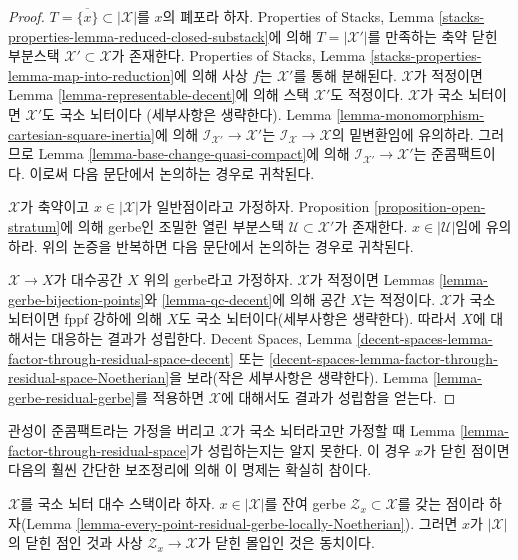 \begin{proof}
$T = \overline{\{x\}} \subset |\mathcal{X}|$를 $x$의 폐포라 하자.
Properties of Stacks, Lemma
\ref{stacks-properties-lemma-reduced-closed-substack}에 의해
$T = |\mathcal{X}'|$를 만족하는 축약 닫힌 부분스택
$\mathcal{X}' \subset \mathcal{X}$가 존재한다. Properties of Stacks,
Lemma \ref{stacks-properties-lemma-map-into-reduction}에 의해 사상 $f$는
$\mathcal{X}'$를 통해 분해된다. $\mathcal{X}$가 적정이면 Lemma
\ref{lemma-representable-decent}에 의해 스택 $\mathcal{X}'$도 적정이다.
$\mathcal{X}$가 국소 뇌터이면 $\mathcal{X}'$도 국소 뇌터이다
(세부사항은 생략한다).
Lemma \ref{lemma-monomorphism-cartesian-square-inertia}에 의해
$\mathcal{I}_{\mathcal{X}'} \to \mathcal{X}'$는
$\mathcal{I}_\mathcal{X} \to \mathcal{X}$의 밑변환임에 유의하라.
그러므로 Lemma \ref{lemma-base-change-quasi-compact}에 의해
$\mathcal{I}_{\mathcal{X}'} \to \mathcal{X}'$는 준콤팩트이다.
이로써 다음 문단에서 논의하는 경우로 귀착된다.

\medskip\noindent
$\mathcal{X}$가 축약이고 $x \in |\mathcal{X}|$가 일반점이라고 가정하자.
Proposition \ref{proposition-open-stratum}에 의해 gerbe인 조밀한 열린
부분스택 $\mathcal{U} \subset \mathcal{X}'$가 존재한다.
$x \in |\mathcal{U}|$임에 유의하라. 위의 논증을 반복하면 다음 문단에서
논의하는 경우로 귀착된다.

\medskip\noindent
$\mathcal{X} \to X$가 대수공간 $X$ 위의 gerbe라고 가정하자.
$\mathcal{X}$가 적정이면 Lemmas \ref{lemma-gerbe-bijection-points}와
\ref{lemma-qc-decent}에 의해 공간 $X$는 적정이다. $\mathcal{X}$가 국소
뇌터이면 fppf 강하에 의해 $X$도 국소 뇌터이다(세부사항은 생략한다).
따라서 $X$에 대해서는 대응하는 결과가 성립한다. Decent Spaces, Lemma
\ref{decent-spaces-lemma-factor-through-residual-space-decent} 또는
\ref{decent-spaces-lemma-factor-through-residual-space-Noetherian}을
보라(작은 세부사항은 생략한다). Lemma
\ref{lemma-gerbe-residual-gerbe}를 적용하면 $\mathcal{X}$에 대해서도
결과가 성립함을 얻는다.
\end{proof}

\begin{remark}
\label{lemma-factor-through-residual-space-Noetherian}
관성이 준콤팩트라는 가정을 버리고 $\mathcal{X}$가 국소 뇌터라고만
가정할 때 Lemma \ref{lemma-factor-through-residual-space}가 성립하는지는
알지 못한다. 이 경우 $x$가 닫힌 점이면 다음의 훨씬 간단한 보조정리에
의해 이 명제는 확실히 참이다.
\end{remark}

\begin{lemma}
\label{lemma-residual-space-closed}
$\mathcal{X}$를 국소 뇌터 대수 스택이라 하자.
$x \in |\mathcal{X}|$를 잔여 gerbe $\mathcal{Z}_x \subset \mathcal{X}$를
갖는 점이라 하자(Lemma
\ref{lemma-every-point-residual-gerbe-locally-Noetherian}).
그러면 $x$가 $|\mathcal{X}|$의 닫힌 점인 것과 사상
$\mathcal{Z}_x \to \mathcal{X}$가 닫힌 몰입인 것은 동치이다.
\end{lemma}

